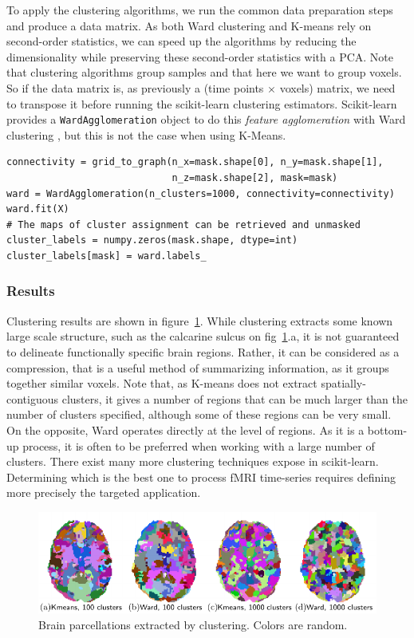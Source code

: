 \documentclass{frontiersSCNS} %
\begin{document}
To apply the clustering algorithms, we run the common data preparation
steps and produce a data matrix. As both Ward clustering and K-means rely
on second-order statistics, we can speed up the algorithms by reducing
the dimensionality while preserving these second-order statistics with a
PCA. Note that clustering algorithms group samples and that here we want
to group voxels. So if the data matrix is, as previously a (time points
$\times$ voxels) matrix, we need to transpose it before running the
scikit-learn clustering estimators. Scikit-learn provides a
\texttt{WardAgglomeration} object to do this \emph{feature agglomeration}
with Ward clustering \citep{michel2012supervisedclustering}, but this is
not the case when using K-Means.

\begin{lstlisting}
connectivity = grid_to_graph(n_x=mask.shape[0], n_y=mask.shape[1],
                             n_z=mask.shape[2], mask=mask)
ward = WardAgglomeration(n_clusters=1000, connectivity=connectivity)
ward.fit(X)
# The maps of cluster assignment can be retrieved and unmasked
cluster_labels = numpy.zeros(mask.shape, dtype=int)
cluster_labels[mask] = ward.labels_
\end{lstlisting}

\subsubsection{Results}

Clustering results are shown in figure~\ref{fig:clustering}. While
clustering extracts some known large scale structure, such as the
calcarine sulcus on fig~\ref{fig:clustering}.a, it is not guaranteed to
delineate functionally specific brain regions. Rather, it can be considered as a compression, that
is a useful method of summarizing information, as it groups together
similar voxels. Note that, as K-means does not extract spatially-contiguous
clusters, it gives a number of regions that can be much larger than the
number of clusters specified, although some of these regions can be very
small. On the opposite, Ward operates directly at the level of regions.
As it is a bottom-up process, it is often to be preferred when working
with a large number of clusters. There exist many more clustering
techniques expose in scikit-learn. Determining which is the best one to
process fMRI time-series requires defining more precisely the targeted
application.

\begin{figure}[hbtp]
  \includegraphics[width=\linewidth]{img/clustering/figure}
  \caption{Brain parcellations extracted by clustering. Colors are
random.}
  \label{fig:clustering}
\end{figure}
\end{document}
